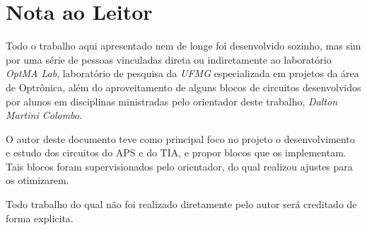 \chapter*[Nota ao Leitor]{Nota ao Leitor}

Todo o trabalho aqui apresentado nem de longe foi desenvolvido sozinho, mas sim por uma série de pessoas vinculadas direta ou indiretamente ao laboratório 
\emph{OptMA Lab}, laboratório de pesquisa da \emph{UFMG} especializada em projetos da área de Optrônica, além do aproveitamento de alguns blocos de circuitos desenvolvidos por alunos em disciplinas ministradas pelo orientador deste trabalho, \emph{Dalton Martini Colombo}.

O autor deste documento teve como principal foco no projeto o desenvolvimento e estudo dos circuitos do APS e do TIA, e propor blocos que os implementam. Tais blocos foram supervisionados pelo orientador, do qual realizou ajustes para os otimizarem.

Todo trabalho do qual não foi realizado diretamente pelo autor será creditado de forma explicita.